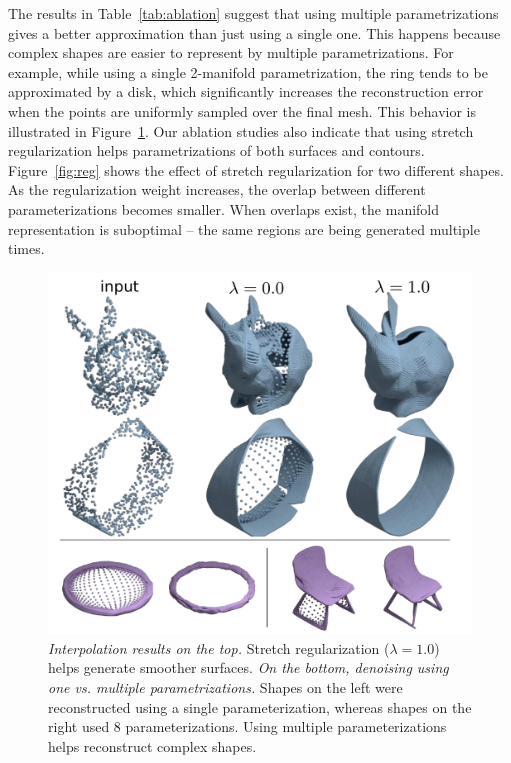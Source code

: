 The results in Table~\ref{tab:ablation} suggest that using multiple parametrizations gives a better approximation than just using a single one.
This happens because complex shapes are easier to represent by multiple parametrizations.
For example, while using a single 2-manifold parametrization, the ring tends to be approximated by a disk, which significantly increases the reconstruction error when
the points are uniformly sampled over the final mesh.
This behavior is illustrated in Figure~\ref{fig:interp}.
Our ablation studies also indicate that using stretch regularization helps
parametrizations of both surfaces and contours.
Figure~\ref{fig:reg} shows the effect of stretch regularization for
two different shapes.
As the regularization weight increases, the overlap between different parameterizations becomes smaller.
When overlaps exist, the manifold representation is suboptimal --
the same regions are being generated multiple times.

\begin{figure}
\centering
\includegraphics[width=0.6\linewidth]{dmp/imgs/interp_rings.pdf}
    \caption{\label{fig:interp} \small 
    \emph{Interpolation results on the top.}
    Stretch regularization ($\lambda=1.0$) helps
    generate smoother surfaces.
    \emph{On the bottom, denoising using one vs. multiple parametrizations.}
   Shapes on the left were reconstructed using a single parameterization, 
    whereas shapes on the right used 8 parameterizations. 
    Using multiple parameterizations helps reconstruct complex shapes.
}
\vspace{-10pt}
\end{figure}


